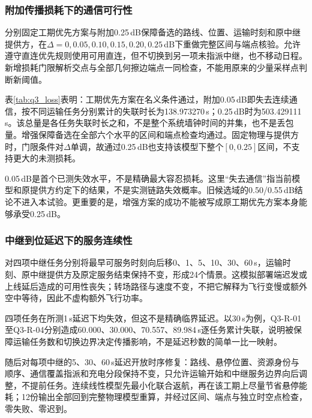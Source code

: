 \subsubsection{附加传播损耗下的通信可行性}
分别固定工期优先方案与附加0.25\,dB保障备选的路线、位置、运输时刻和原中继提供方，在$\Delta=0,0.05,0.10,0.15,0.20,0.25$\,dB下重做完整区间与端点核验。允许遵守直连优先规则使用可用直连，但不切换到另一项未指派中继，也不移动日程。新增损耗门限解析交点与全部几何擦边端点一同检查，不能用原来的少量采样点判断新阈值。

表\ref{tab:q3_loss}表明：工期优先方案在名义条件通过，附加0.05\,dB即失去连续通信，按不同运输任务分别累计的失联时长为138.973270\,s；0.25\,dB时为503.429111\,s。该总量是各任务失联时长之和，不是整个系统墙钟时间的并集，也不是丢包量。增强保障备选在全部六个水平的区间和端点检查均通过。固定物理与提供方时，门限条件对$\Delta$单调，故通过0.25\,dB也支持该模型下整个$[0,0.25]$区间，不支持更大的未测损耗。


0.05\,dB是首个已测失效水平，不是精确最大容忍损耗。这里“失去通信”指当前模型和原提供方约定下的结果，不是实测链路失效概率。旧候选域的0.50/0.55\,dB结论不进入本试验。更重要的是，增强方案的成功不能被写成原工期优先方案本身能够承受0.25\,dB。

\subsubsection{中继到位延迟下的服务连续性}
对四项中继任务分别将最早可服务时刻向后移0、1、5、10、30、60\,s，运输时刻、原中继提供方及原定服务结束保持不变，形成24个情景。这模拟部署端迟发或上线延后造成的可用性丧失；转场路径与速度不变，不把它解释为飞行变慢或额外空中等待，因此不虚构额外飞行功率。

四项任务在所测1\,s延迟下均失效，但这不是精确临界延迟。以30\,s为例，Q3-R-01至Q3-R-04分别造成60.000、30.000、70.557、89.984\,s逐任务累计失联，说明被保障运输任务数和切换边界决定传播影响，不是延迟秒数的简单一比一映射。

随后对每项中继的5、30、60\,s延迟开放时序修复：路线、悬停位置、资源身份与顺序、通信覆盖指派和充电分段保持不变，只允许运输开始和中继服务边界向后调整，不提前任务。连续线性模型先最小化联合返航，再在该工期上尽量节省悬停能耗；12份输出全部回到完整物理模型重算，并经过区间、端点与独立时空点检查，零失败、零迟到。



